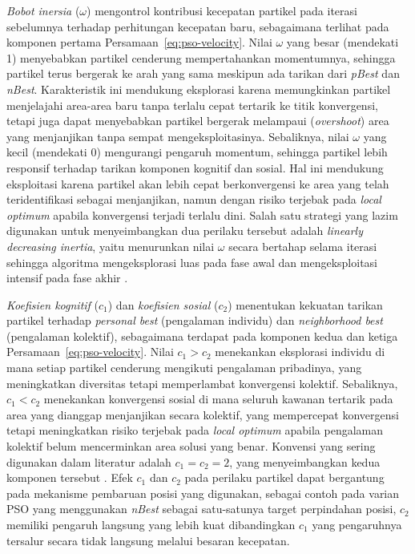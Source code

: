 \textit{Bobot inersia} ($\omega$) mengontrol kontribusi kecepatan partikel pada iterasi sebelumnya terhadap perhitungan kecepatan baru, sebagaimana terlihat pada komponen pertama Persamaan~\ref{eq:pso-velocity}. Nilai $\omega$ yang besar (mendekati 1) menyebabkan partikel cenderung mempertahankan momentumnya, sehingga partikel terus bergerak ke arah yang sama meskipun ada tarikan dari \textit{pBest} dan \textit{nBest}. Karakteristik ini mendukung eksplorasi karena memungkinkan partikel menjelajahi area-area baru tanpa terlalu cepat tertarik ke titik konvergensi, tetapi juga dapat menyebabkan partikel bergerak melampaui (\textit{overshoot}) area yang menjanjikan tanpa sempat mengeksploitasinya. Sebaliknya, nilai $\omega$ yang kecil (mendekati 0) mengurangi pengaruh momentum, sehingga partikel lebih responsif terhadap tarikan komponen kognitif dan sosial. Hal ini mendukung eksploitasi karena partikel akan lebih cepat berkonvergensi ke area yang telah teridentifikasi sebagai menjanjikan, namun dengan risiko terjebak pada \textit{local optimum} apabila konvergensi terjadi terlalu dini. Salah satu strategi yang lazim digunakan untuk menyeimbangkan dua perilaku tersebut adalah \textit{linearly decreasing inertia}, yaitu menurunkan nilai $\omega$ secara bertahap selama iterasi sehingga algoritma mengeksplorasi luas pada fase awal dan mengeksploitasi intensif pada fase akhir \cite{engelbrecht2007computational}.

\textit{Koefisien kognitif} ($c_1$) dan \textit{koefisien sosial} ($c_2$) menentukan kekuatan tarikan partikel terhadap \textit{personal best} (pengalaman individu) dan \textit{neighborhood best} (pengalaman kolektif), sebagaimana terdapat pada komponen kedua dan ketiga Persamaan~\ref{eq:pso-velocity}. Nilai $c_1 > c_2$ menekankan eksplorasi individu di mana setiap partikel cenderung mengikuti pengalaman pribadinya, yang meningkatkan diversitas tetapi memperlambat konvergensi kolektif. Sebaliknya, $c_1 < c_2$ menekankan konvergensi sosial di mana seluruh kawanan tertarik pada area yang dianggap menjanjikan secara kolektif, yang mempercepat konvergensi tetapi meningkatkan risiko terjebak pada \textit{local optimum} apabila pengalaman kolektif belum mencerminkan area solusi yang benar. Konvensi yang sering digunakan dalam literatur adalah $c_1 = c_2 = 2$, yang menyeimbangkan kedua komponen tersebut \cite{kennedy1995particle}. Efek $c_1$ dan $c_2$ pada perilaku partikel dapat bergantung pada mekanisme pembaruan posisi yang digunakan, sebagai contoh pada varian PSO yang menggunakan \textit{nBest} sebagai satu-satunya target perpindahan posisi, $c_2$ memiliki pengaruh langsung yang lebih kuat dibandingkan $c_1$ yang pengaruhnya tersalur secara tidak langsung melalui besaran kecepatan.

